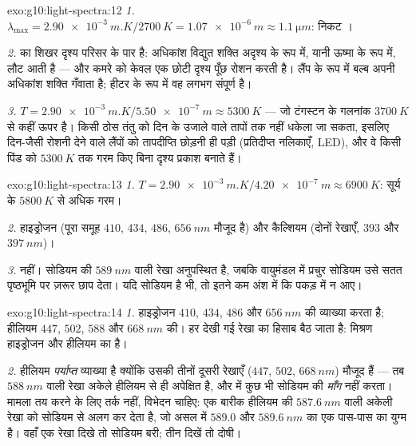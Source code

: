 \begin{solution}{exo:g10:light-spectra:12}
\emph{1.} $\lambda_{\max} = \qty{2.90e-3}{m.K} / \qty{2700}{K}
= \qty{1.07e-6}{m} \approx \qty{1.1}{\micro m}$: निकट ।

\emph{2.}  का शिखर दृश्य परिसर के पार है: अधिकांश
विद्युत शक्ति अदृश्य  के रूप में, यानी ऊष्मा के रूप में,
लौट आती है --- और कमरे को केवल एक छोटी दृश्य पूँछ रोशन करती है। लैंप के
रूप में बल्ब अपनी अधिकांश शक्ति गँवाता है; हीटर के रूप में वह लगभग
संपूर्ण है।

\emph{3.} $T = \qty{2.90e-3}{m.K} / \qty{5.50e-7}{m} \approx
\qty{5300}{K}$ --- जो टंगस्टन के गलनांक $\qty{3700}{K}$ से कहीं ऊपर है। किसी
ठोस तंतु को दिन के उजाले वाले तापों तक नहीं धकेला जा सकता, इसलिए
दिन-जैसी रोशनी देने वाले लैंपों को तापदीप्ति छोड़नी ही पड़ी (प्रतिदीप्त
नलिकाएँ, LED), और वे किसी पिंड को $\qty{5300}{K}$ तक गरम किए बिना दृश्य प्रकाश
बनाते हैं।
\end{solution}

\begin{solution}{exo:g10:light-spectra:13}
\emph{1.} $T = \qty{2.90e-3}{m.K} / \qty{4.20e-7}{m} \approx
\qty{6900}{K}$: सूर्य के $\qty{5800}{K}$ से अधिक गरम।

\emph{2.} हाइड्रोजन (पूरा समूह $410$, $434$, $486$, $\qty{656}{nm}$ मौजूद है)
और कैल्शियम (दोनों रेखाएँ, $393$ और $\qty{397}{nm}$)।

\emph{3.} नहीं। सोडियम की $\qty{589}{nm}$ वाली रेखा अनुपस्थित है, जबकि वायुमंडल
में प्रचुर सोडियम उसे सतत पृष्ठभूमि पर ज़रूर छाप देता। यदि सोडियम है भी,
तो इतने कम अंश में कि पकड़ में न आए।
\end{solution}

\begin{solution}{exo:g10:light-spectra:14}
\emph{1.} हाइड्रोजन $410$, $434$, $486$ और $\qty{656}{nm}$ की व्याख्या करता
है; हीलियम $447$, $502$, $588$ और $\qty{668}{nm}$ की। हर देखी गई रेखा का
हिसाब बैठ जाता है: मिश्रण हाइड्रोजन और हीलियम का है।

\emph{2.} हीलियम \emph{पर्याप्त} व्याख्या है क्योंकि उसकी तीनों दूसरी
रेखाएँ ($447$, $502$, $\qty{668}{nm}$) मौजूद हैं --- तब $\qty{588}{nm}$ वाली रेखा
अकेले हीलियम से ही अपेक्षित है, और  में कुछ भी सोडियम
की \emph{माँग} नहीं करता। मामला तय करने के लिए तर्क नहीं, विभेदन चाहिए:
एक बारीक  हीलियम की $\qty{587.6}{nm}$ वाली अकेली रेखा को
सोडियम से अलग कर देता है, जो असल में $589.0$ और $\qty{589.6}{nm}$ का एक पास-पास
का युग्म है। वहाँ एक रेखा दिखे तो सोडियम बरी; तीन दिखें तो दोषी।
\end{solution}

